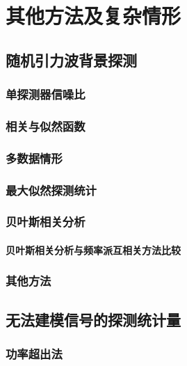 
\chapter{其他方法及复杂情形}
\label{chap8}

\section{随机引力波背景探测}
\subsection{单探测器信噪比}
\subsection{相关与似然函数}
\subsection{多数据情形}
\subsection{最大似然探测统计}
\subsection{贝叶斯相关分析}
\subsubsection{贝叶斯相关分析与频率派互相关方法比较}
\subsection{其他方法}

\section{无法建模信号的探测统计量}
\subsection{功率超出法}

